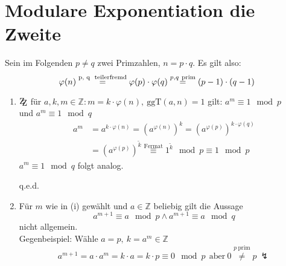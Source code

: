 \documentclass[DIN, pagenumber=false, fontsize=11pt, parskip=half]{scrartcl}
\newcommand{\Z}[0]{\mathbb{Z}}
\newcommand{\ZZ}{\mathrm{Z\kern-.3em\raise-0.5ex\hbox{Z}}}
\newcommand{\ggt}{\text{ggT}}
\newcommand{\congTo}[3][]{\stackrel{#1}{\equiv} #2\mod #3}
\newcommand{\Qed}{\begin{flushright}
    q.e.d.
\end{flushright}}
\begin{document}
    \section{Modulare Exponentiation die Zweite}
    Sein  im Folgenden $p \neq q$ zwei Primzahlen, $n = p \cdot q$. Es gilt also:
    \begin{equation}
        \varphi(n) \stackrel{\text{p, q \ \text{teilerfremd}}}{=} \varphi(p) \cdot \varphi(q) \stackrel{p, q \ \text{prim}}{=} (p - 1) \cdot (q - 1)
        \label{eq:phi}
    \end{equation}
    \begin{enumerate}[label=(\roman*)]
        \item $\ZZ$ für $a, k, m \in \Z :  m = k \cdot \varphi(n), \ \ggt(a, n) = 1$ gilt: $a^m \congTo{1}{p}$ \\ und $a^m \congTo{1}{q}$ \\
              \begin{align}
                  a^m &= a^{k \cdot \varphi(n)} = \left(a^{\varphi(n)}\right)^k = \left(a^{\varphi(p)}\right)^{k \cdot \varphi(q)} \\
                  &= \left(a^{\varphi(p)}\right)^{\tilde{k}} \congTo[\text{Fermat}]{1^{\tilde{k}}}{p} \congTo{1}{p}
              \end{align}
              $a^m \congTo{1}{q}$ folgt analog. \Qed
        \item Für $m$ wie in (i) gewählt und $a \in \Z$ beliebig gilt die Aussage
              \begin{equation}
                  a^{m + 1} \congTo{a}{p} \wedge a^{m + 1} \congTo{a}{q}
              \end{equation}
              nicht allgemein. \\
              Gegenbeispiel: Wähle $a = p, \ k = a^m \in \Z$
              \begin{equation}
                  a^{m + 1} = a \cdot a^m = k \cdot a = k \cdot p \congTo{0}{p} \ \ \text{aber} \ 0 \stackrel{p \ \text{prim}}{\neq} p \ \lightning
              \end{equation}
    \end{enumerate}
\end{document}
